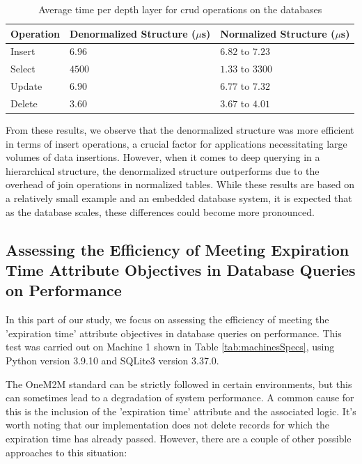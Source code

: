 \documentclass[a4paper,fleqn]{cas-dc}
\begin{document}
\begin{table}[h]
\scriptsize
\centering
\caption{Average time per depth layer for \gls{crud} operations on the databases}
\label{tab:DBComparisonResults}
\begin{tabular}{ p{1cm} p{3cm} p{3cm} }
\hline
\textbf{Operation} & \textbf{Denormalized Structure ($\mu$s)} & \textbf{Normalized Structure ($\mu$s)} \\
\hline \hline
Insert & $6.96$ & $6.82$ to $7.23$ \\
Select & $4500$ & $1.33$ to $3300$ \\
Update & $6.90$ & $6.77$ to $7.32$ \\
Delete & $3.60$ & $3.67$ to $4.01$ \\
\hline
\end{tabular}
\end{table}

From these results, we observe that the denormalized structure was more efficient in terms of insert operations, a crucial factor for applications necessitating large volumes of data insertions. However, when it comes to deep querying in a hierarchical structure, the denormalized structure outperforms due to the overhead of join operations in normalized tables. While these results are based on a relatively small example and an embedded database system, it is expected that as the database scales, these differences could become more pronounced.

\subsection{Assessing the Efficiency of Meeting Expiration Time Attribute Objectives in Database Queries on Performance}

In this part of our study, we focus on assessing the efficiency of meeting the 'expiration time' attribute objectives in database queries on performance. This test was carried out on Machine 1 shown in Table \ref{tab:machinesSpecs}, using Python version 3.9.10 and SQLite3 version 3.37.0.

The OneM2M standard can be strictly followed in certain environments, but this can sometimes lead to a degradation of system performance. A common cause for this is the inclusion of the 'expiration time' attribute and the associated logic. It's worth noting that our implementation does not delete records for which the expiration time has already passed. However, there are a couple of other possible approaches to this situation:
\end{document}
